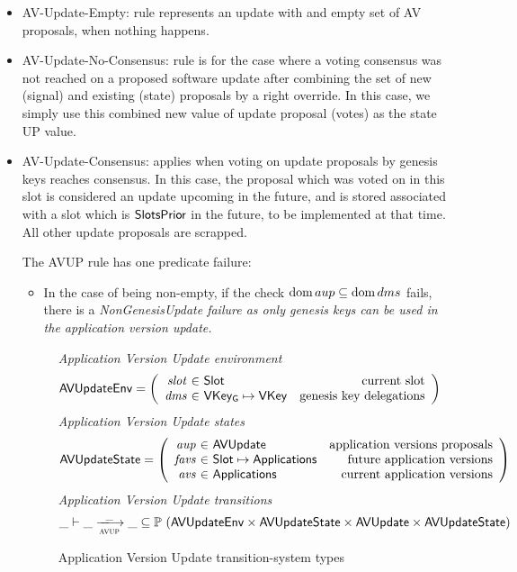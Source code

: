 \begin{itemize}
  \item AV-Update-Empty: rule represents an update with
and empty set of AV proposals, when nothing happens.
  \item AV-Update-No-Consensus: rule
is for the case where a voting consensus was not reached on a proposed software
update after combining the set of new (signal) and existing (state) proposals
by a right override. In this case, we simply use this combined new value
of update proposal (votes) as the state UP value.
  \item AV-Update-Consensus: applies when voting on update proposals by genesis keys
reaches consensus. In this case, the proposal which was voted on in this slot
is considered an update upcoming in the future, and is stored associated
with a slot which is $\mathsf{SlotsPrior}$ in the future, to be implemented at that time.
All other update proposals are scrapped.

The AVUP rule has one predicate failure:
\begin{itemize}
\item In the case of  being non-empty, if the check $\operatorname{dom} aup \subseteq
  \operatorname{dom} dms$ fails, there is a \em{NonGenesisUpdate} failure as only genesis keys
  can be used in the application version update.
\end{itemize}

\begin{figure}[htb]
  \emph{Application Version Update environment}
  \begin{equation*}
    \AVUpdateEnv =
    \left(
      \begin{array}{r@{~\in~}lr}
        \var{slot} & \Slot & \text{current slot}\\
        \var{dms} & \VKeyGen\mapsto\VKey & \text{genesis key delegations} \\
      \end{array}
    \right)
  \end{equation*}
  \emph{Application Version Update states}
  \begin{equation*}
    \AVUpdateState =
    \left(
      \begin{array}{r@{~\in~}lr}
        \var{aup} & \AVUpdate & \text{application versions proposals} \\
        \var{favs} & \Slot\mapsto\Applications & \text{future application versions} \\
        \var{avs} & \Applications & \text{current application versions} \\
      \end{array}
    \right)
  \end{equation*}
  \emph{Application Version Update transitions}
  \begin{equation*}
    \_ \vdash
    \var{\_} \trans{avup}{\_} \var{\_}
    \subseteq \powerset (\AVUpdateEnv \times \AVUpdateState \times \AVUpdate \times \AVUpdateState)
  \end{equation*}
  \caption{Application Version Update transition-system types}
  \label{fig:ts-types:av-update}
\end{figure}


\end{itemize}
